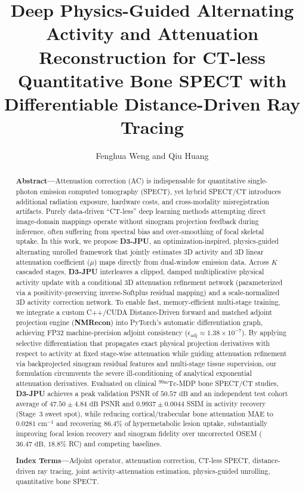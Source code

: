 \documentclass[11pt, a4paper]{article}
\title{\textbf{Deep Physics-Guided Alternating Activity and Attenuation Reconstruction for CT-less Quantitative Bone SPECT with Differentiable Distance-Driven Ray Tracing}}
\author{Fenghua Weng and Qiu Huang}
\date{}
\begin{document}
\maketitle

\begin{abstract}
\noindent \textbf{Abstract---}Attenuation correction (AC) is indispensable for quantitative single-photon emission computed tomography (SPECT), yet hybrid SPECT/CT introduces additional radiation exposure, hardware costs, and cross-modality misregistration artifacts. Purely data-driven ``CT-less'' deep learning methods attempting direct image-domain mappings operate without sinogram projection feedback during inference, often suffering from spectral bias and over-smoothing of focal skeletal uptake. In this work, we propose \textbf{D3-JPU}, an optimization-inspired, physics-guided alternating unrolled framework that jointly estimates 3D activity and 3D linear attenuation coefficient ($\mu$) maps directly from dual-window emission data. Across $K$ cascaded stages, \textbf{D3-JPU} interleaves a clipped, damped multiplicative physical activity update with a conditional 3D attenuation refinement network (parameterized via a positivity-preserving inverse-Softplus residual mapping) and a scale-normalized 3D activity correction network. To enable fast, memory-efficient multi-stage training, we integrate a custom C++/CUDA Distance-Driven forward and matched adjoint projection engine (\textbf{NMRecon}) into PyTorch's automatic differentiation graph, achieving FP32 machine-precision adjoint consistency ($\epsilon_{\text{adj}} \approx 1.38 \times 10^{-7}$). By applying selective differentiation that propagates exact physical projection derivatives with respect to activity at fixed stage-wise attenuation while guiding attenuation refinement via backprojected sinogram residual features and multi-stage tissue supervision, our formulation circumvents the severe ill-conditioning of analytical exponential attenuation derivatives. Evaluated on clinical $^{99\text{m}}\text{Tc}$-MDP bone SPECT/CT studies, \textbf{D3-JPU} achieves a peak validation PSNR of $50.57\text{ dB}$ and an independent test cohort average of $47.50 \pm 4.84\text{ dB}$ PSNR and $0.9937 \pm 0.0044$ SSIM in activity recovery (Stage~3 sweet spot), while reducing cortical/trabecular bone attenuation MAE to $0.0281\text{ cm}^{-1}$ and recovering $86.4\%$ of hypermetabolic lesion uptake, substantially improving focal lesion recovery and sinogram fidelity over uncorrected OSEM ($36.47\text{ dB}$, $18.8\%$ RC) and competing baselines.

\vspace{0.5em}
\noindent \textbf{Index Terms---}Adjoint operator, attenuation correction, CT-less SPECT, distance-driven ray tracing, joint activity-attenuation estimation, physics-guided unrolling, quantitative bone SPECT.
\end{abstract}
\end{document}

